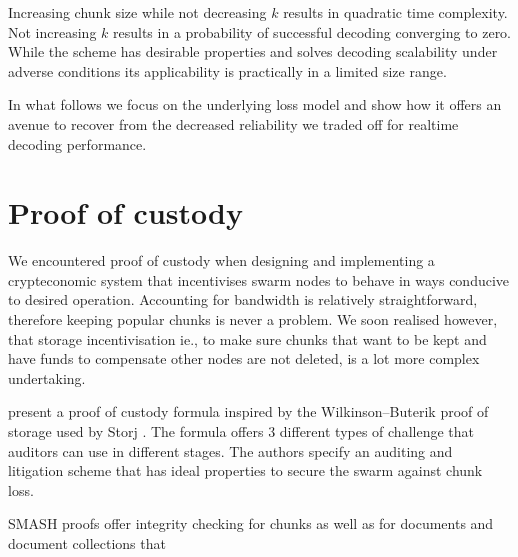 \documentclass[12pt]{article}
\begin{document}
Increasing chunk size while not decreasing $k$ results in quadratic time complexity. Not increasing $k$ results in a probability of successful decoding converging to zero.
While the scheme has desirable properties and solves decoding scalability under adverse conditions its applicability is practically in a limited size range.

In what follows we focus on the underlying loss model and  show how it offers an avenue to recover from the decreased reliability we  traded off for realtime decoding performance.


\section{Proof of custody}

We encountered proof of custody when designing and implementing a crypteconomic system that incentivises swarm nodes to behave in ways conducive to desired operation.
Accounting for bandwidth is relatively straightforward, therefore keeping popular chunks is never a problem. We soon realised however, that storage incentivisation ie., to make sure chunks that want to be kept and have funds to compensate other nodes are not deleted, is a lot more complex undertaking.

\cite{ethersphere2016smash} present a proof of custody formula inspired by the Wilkinson--Buterik proof of storage used by Storj \cite{wilkinsonetal2014storj}. The formula offers 3 different types of challenge that auditors can use in different stages. The authors specify an auditing and litigation scheme that has ideal properties to secure the swarm against chunk loss.

SMASH proofs offer integrity checking for chunks as well as for documents and document collections that
\end{document}
